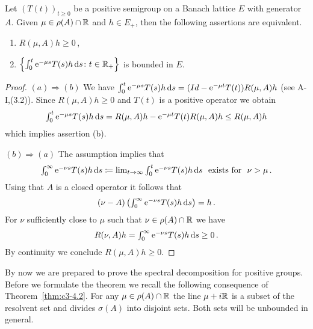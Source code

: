 \begin{lemma}\label{lem:c3-4.7}
Let $(T(t))_{t \geq 0}$ be a positive semigroup on a Banach
lattice $E$ with generator $A$. Given $\mu \in \rho(A) \cap \mathbb{R} $ and $h \in E_+$, then the following assertions are equivalent.
\begin{enumerate}[\upshape (a)]
	\item 
	$R(\mu,A)h \geq 0$\,,

	\item 
	$\left\{\int_{0}^{t} \mathrm{e}^{-\mu s}T(s)h \mathop{}\!\mathrm{d}{s} \colon t \in \mathbb{R} _+\right\}$ is bounded in $E$.
\end{enumerate}
\end{lemma}
\begin{proof}
$(a)\Rightarrow(b)$  We have
$\int_{0}^{t} \mathrm{e}^{-\mu s}T(s)h \mathop{}\!\mathrm{d}{s} = (Id - \mathrm{e}^{-\mu t}T(t))R(\mu,A)h$ (see A-I,(3.2)).
Since $R(\mu,A)h \geq 0$ and $T(t)$ is a positive operator we obtain
\[\textstyle
\int_{0}^{t} \mathrm{e}^{-\mu s}T(s)h \mathop{}\!\mathrm{d}{s} = R(\mu,A)h - \mathrm{e}^{-\mu t}T(t)R(\mu,A)h \leq R(\mu,A)h
\] 
which implies assertion (b).

$(b)\Rightarrow(a)$  The assumption implies that 
\[\textstyle
\int_{0}^{\infty} \mathrm{e}^{-\nu s}T(s)h \mathop{}\!\mathrm{d}{s} \coloneqq 
\lim_{t \to \infty} \int_{0}^{t} \mathrm{e}^{-\nu s}T(s)h \mathop{}\!\mathrm{d}{s} \ \text{ exists for } \ \nu > \mu\,. 
\]
Using that $A$ is a closed operator it follows that 
\[\textstyle
(\nu - A)\left(\int_{0}^{\infty} \mathrm{e}^{-\nu s}T(s)h \mathop{}\!\mathrm{d}{s}\right) = h\,.
\]
For $\nu$
sufficiently close to $\mu$ such that $\nu \in \rho(A) \cap \mathbb{R} $ we have 
\[\textstyle
R(\nu,A)h = \int_{0}^{\infty} \mathrm{e}^{-\nu s}T(s)h \mathop{}\!\mathrm{d}{s} \geq 0\,. 
\] 
By continuity we conclude $R(\mu,A)h \geq 0$.
\end{proof}
By now we are prepared to prove the spectral decomposition for positive groups. Before we formulate the theorem we recall the following
consequence of Theorem~\ref{thm:c3-4.2}. For any $\mu \in \rho(A) \cap \mathbb{R} $ the line $\mu+i\mathbb{R} $ is a
subset of the resolvent set and divides $\sigma(A)$ into disjoint sets.
Both sets will be unbounded in general.

